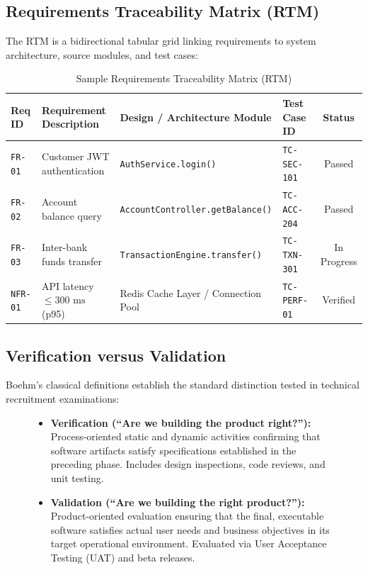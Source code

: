 \subsection{Requirements Traceability Matrix (RTM)}
The RTM is a bidirectional tabular grid linking requirements to system architecture, source modules, and test cases:
\begin{table}[htbp]
\centering
\small
\caption{Sample Requirements Traceability Matrix (RTM)}
\label{tab:sample_rtm}
\begin{tabularx}{\textwidth}{l X X l c}
\toprule
\textbf{Req ID} & \textbf{Requirement Description} & \textbf{Design / Architecture Module} & \textbf{Test Case ID} & \textbf{Status} \\
\midrule
\texttt{FR-01} & Customer JWT authentication & \texttt{AuthService.login()} & \texttt{TC-SEC-101} & Passed \\
\texttt{FR-02} & Account balance query & \texttt{AccountController.getBalance()} & \texttt{TC-ACC-204} & Passed \\
\texttt{FR-03} & Inter-bank funds transfer & \texttt{TransactionEngine.transfer()} & \texttt{TC-TXN-301} & In Progress \\
\texttt{NFR-01} & API latency $\le 300\text{ ms}$ (p95) & Redis Cache Layer / Connection Pool & \texttt{TC-PERF-01} & Verified \\
\bottomrule
\end{tabularx}
\end{table}

\subsection{Verification versus Validation}
Boehm's classical definitions establish the standard distinction tested in technical recruitment examinations:
\begin{figure}[htbp]
\centering
\begin{tcolorbox}[colback=codebg, colframe=primary, title=\textbf{Verification versus Validation: The Core Distinction}]
\begin{itemize}
    \item \textbf{Verification (``Are we building the product right?''):} Process-oriented static and dynamic activities confirming that software artifacts satisfy specifications established in the preceding phase. Includes design inspections, code reviews, and unit testing.
    \item \textbf{Validation (``Are we building the right product?''):} Product-oriented evaluation ensuring that the final, executable software satisfies actual user needs and business objectives in its target operational environment. Evaluated via User Acceptance Testing (UAT) and beta releases.
\end{itemize}
\end{tcolorbox}
\end{figure}

